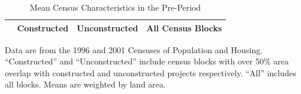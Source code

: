 \documentclass[12pt]{article}
\begin{document}
\begin{table}[h!]
	\centering
	\caption{Mean Census Characteristics in the Pre-Period}\label{table:projectdescriptivescensus}
\vspace{-2mm}
\begin{threeparttable}
\begin{tabular}{l*{1}{ccc}}
\toprule
& Constructed & Unconstructed & All Census Blocks \\
\midrule
 
\bottomrule
\end{tabular}
\begin{tablenotes}
\item \footnotesize Data are from the 1996 and 2001 Censuses of Population and Housing.
``Constructed'' and ``Unconstructed'' include census blocks with over 50\% 
 area overlap with constructed and unconstructed projects respectively. 
``All''  includes all blocks.  Means are weighted by land area.
\end{tablenotes}
\end{threeparttable}
\end{table}


\begin{table}[ht!]
\small
\centering
\caption{Triple Difference Estimates of Housing Density }\label{table:bbluDDDfull}
\vspace{-2mm}
\end{table}
\end{document}
